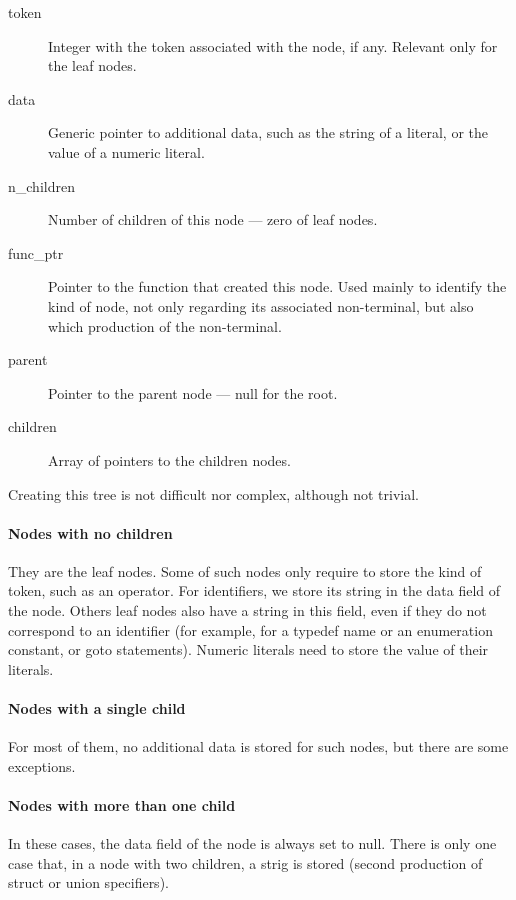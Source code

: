 \documentclass[a4paper,openany]{refrep}
\begin{document}
\begin{description}
\item[token] Integer with the token associated with the node, if any. Relevant only for the leaf nodes.

\item[data] Generic pointer to additional data, such as the string of a literal, or the value of a numeric literal.

\item[n\_children] Number of children of this node --- zero of leaf nodes.

\item[func\_ptr] Pointer to the function that created this node. Used mainly to identify the kind of node, not only regarding its associated non-terminal, but also which production of the non-terminal.

\item[parent] Pointer to the parent node --- null for the root.

\item[children] Array of pointers to the children nodes.
\end{description}

Creating this tree is not difficult nor complex, although not trivial.

\paragraph{Nodes with no children}
They are the leaf nodes. Some of such nodes only require to store the kind of token, such as an operator. For identifiers, we store its string in the data field of the node. Others leaf nodes also have a string in this field, even if they do not correspond to an identifier (for example, for a typedef name or an enumeration constant, or goto statements). Numeric literals need to store the value of their literals.

\paragraph{Nodes with a single child}
For most of them, no additional data is stored for such nodes, but there are some exceptions.

\paragraph{Nodes with more than one child}
In these cases, the data field of the node is always set to null. There is only one case that, in a node with two children, a strig is stored (second production of struct or union specifiers).
\end{document}
